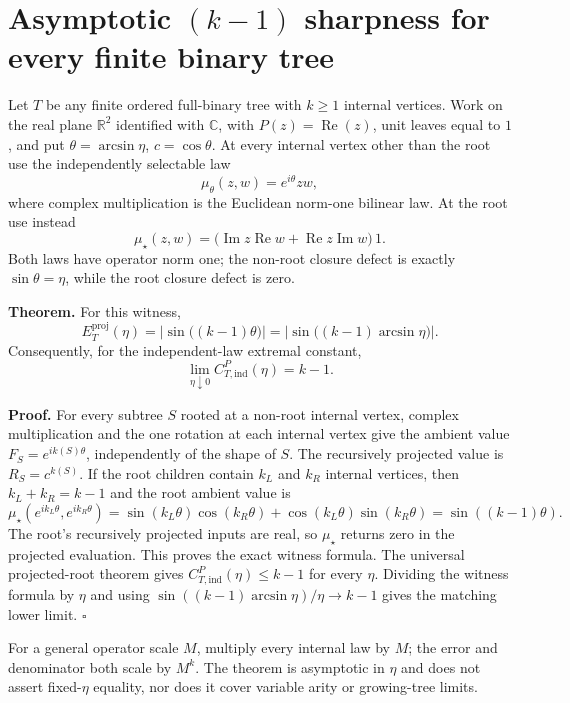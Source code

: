 \section*{Asymptotic $(k-1)$ sharpness for every finite binary tree}
\label{sec:m18-binary-tree-asymptotic}

Let $T$ be any finite ordered full-binary tree with $k\ge1$ internal
vertices.  Work on the real plane $\mathbb R^2$ identified with $\mathbb C$, with
$P(z)=\operatorname{Re}(z)$, unit leaves equal to $1$, and put
$\theta=\arcsin\eta$, $c=\cos\theta$.  At every internal vertex other than
the root use the independently selectable law
\[
  \mu_\theta(z,w)=e^{i\theta}zw,
\]
where complex multiplication is the Euclidean norm-one bilinear law.  At
the root use instead
\[
  \mu_\star(z,w)=\bigl(\operatorname{Im}z\operatorname{Re}w
  +\operatorname{Re}z\operatorname{Im}w\bigr)\,1.
\]
Both laws have operator norm one; the non-root closure defect is exactly
$\sin\theta=\eta$, while the root closure defect is zero.

\textbf{Theorem.}  For this witness,
\[
  E_T^{\mathrm{proj}}(\eta)
  =\left|\sin\bigl((k-1)\theta\bigr)\right|
  =\left|\sin\bigl((k-1)\arcsin\eta\bigr)\right|.
\]
Consequently, for the independent-law extremal constant,
\[
  \boxed{
  \lim_{\eta\downarrow0} C_{T,\mathrm{ind}}^P(\eta)=k-1.
  }
\]

\textbf{Proof.}  For every subtree $S$ rooted at a non-root internal vertex,
complex multiplication and the one rotation at each internal vertex give the
ambient value $F_S=e^{i k(S)\theta}$, independently of the shape of $S$.
The recursively projected value is $R_S=c^{k(S)}$.  If the root children
contain $k_L$ and $k_R$ internal vertices, then $k_L+k_R=k-1$ and the root
ambient value is
\[
 \mu_\star(e^{ik_L\theta},e^{ik_R\theta})
 =\sin(k_L\theta)\cos(k_R\theta)
  +\cos(k_L\theta)\sin(k_R\theta)
 =\sin((k-1)\theta).
\]
The root's recursively projected inputs are real, so $\mu_\star$ returns
zero in the projected evaluation.  This proves the exact witness formula.
The universal projected-root theorem gives
$C_{T,\mathrm{ind}}^P(\eta)\le k-1$ for every $\eta$.  Dividing the witness
formula by $\eta$ and using
$\sin((k-1)\arcsin\eta)/\eta\to k-1$ gives the matching lower limit.
\hfill$\square$

For a general operator scale $M$, multiply every internal law by $M$; the
error and denominator both scale by $M^k$.  The theorem is asymptotic in
$\eta$ and does not assert fixed-$\eta$ equality, nor does it cover variable
arity or growing-tree limits.
